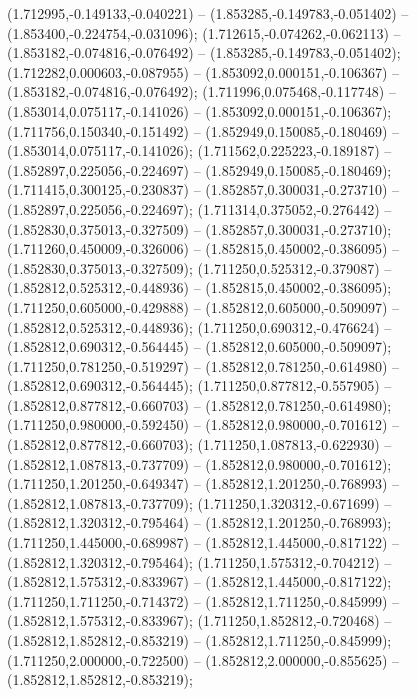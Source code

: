  (1.712995,-0.149133,-0.040221) -- (1.853285,-0.149783,-0.051402) -- (1.853400,-0.224754,-0.031096);
 (1.712615,-0.074262,-0.062113) -- (1.853182,-0.074816,-0.076492) -- (1.853285,-0.149783,-0.051402);
 (1.712282,0.000603,-0.087955) -- (1.853092,0.000151,-0.106367) -- (1.853182,-0.074816,-0.076492);
 (1.711996,0.075468,-0.117748) -- (1.853014,0.075117,-0.141026) -- (1.853092,0.000151,-0.106367);
 (1.711756,0.150340,-0.151492) -- (1.852949,0.150085,-0.180469) -- (1.853014,0.075117,-0.141026);
 (1.711562,0.225223,-0.189187) -- (1.852897,0.225056,-0.224697) -- (1.852949,0.150085,-0.180469);
 (1.711415,0.300125,-0.230837) -- (1.852857,0.300031,-0.273710) -- (1.852897,0.225056,-0.224697);
 (1.711314,0.375052,-0.276442) -- (1.852830,0.375013,-0.327509) -- (1.852857,0.300031,-0.273710);
 (1.711260,0.450009,-0.326006) -- (1.852815,0.450002,-0.386095) -- (1.852830,0.375013,-0.327509);
 (1.711250,0.525312,-0.379087) -- (1.852812,0.525312,-0.448936) -- (1.852815,0.450002,-0.386095);
 (1.711250,0.605000,-0.429888) -- (1.852812,0.605000,-0.509097) -- (1.852812,0.525312,-0.448936);
 (1.711250,0.690312,-0.476624) -- (1.852812,0.690312,-0.564445) -- (1.852812,0.605000,-0.509097);
 (1.711250,0.781250,-0.519297) -- (1.852812,0.781250,-0.614980) -- (1.852812,0.690312,-0.564445);
 (1.711250,0.877812,-0.557905) -- (1.852812,0.877812,-0.660703) -- (1.852812,0.781250,-0.614980);
 (1.711250,0.980000,-0.592450) -- (1.852812,0.980000,-0.701612) -- (1.852812,0.877812,-0.660703);
 (1.711250,1.087813,-0.622930) -- (1.852812,1.087813,-0.737709) -- (1.852812,0.980000,-0.701612);
 (1.711250,1.201250,-0.649347) -- (1.852812,1.201250,-0.768993) -- (1.852812,1.087813,-0.737709);
 (1.711250,1.320312,-0.671699) -- (1.852812,1.320312,-0.795464) -- (1.852812,1.201250,-0.768993);
 (1.711250,1.445000,-0.689987) -- (1.852812,1.445000,-0.817122) -- (1.852812,1.320312,-0.795464);
 (1.711250,1.575312,-0.704212) -- (1.852812,1.575312,-0.833967) -- (1.852812,1.445000,-0.817122);
 (1.711250,1.711250,-0.714372) -- (1.852812,1.711250,-0.845999) -- (1.852812,1.575312,-0.833967);
 (1.711250,1.852812,-0.720468) -- (1.852812,1.852812,-0.853219) -- (1.852812,1.711250,-0.845999);
 (1.711250,2.000000,-0.722500) -- (1.852812,2.000000,-0.855625) -- (1.852812,1.852812,-0.853219);
